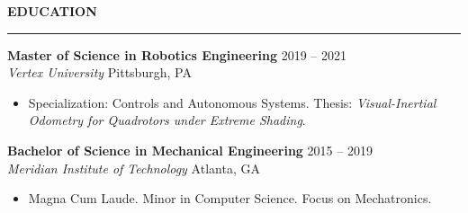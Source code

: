 \documentclass[10pt,letterpaper]{article}
\newcommand{\cvsection}[1]{%
  \vspace{6pt}%
  \phantomsection
  {\color{accent}\large\bfseries\MakeUppercase{#1}}%
  \vspace{1pt}%
  \par\noindent\textcolor{accent}{\rule{\linewidth}{1pt}}%
  \vspace{4pt}%
}
\newcommand{\cventry}[4]{%
  \noindent
  \begin{minipage}[t]{\linewidth}
    \textbf{#1} \hfill {\color{secondary}\small #2} \\
    \textit{#3} \hfill {\color{secondary}\small #4}
  \end{minipage}%
  \vspace{2pt}%
}
\begin{document}
\cvsection{Education}

\cventry{Master of Science in Robotics Engineering}{2019 -- 2021}{Vertex University}{Pittsburgh, PA}
\begin{itemize}
  \item Specialization: Controls and Autonomous Systems. Thesis: \textit{Visual-Inertial Odometry for Quadrotors under Extreme Shading}.
\end{itemize}

\cventry{Bachelor of Science in Mechanical Engineering}{2015 -- 2019}{Meridian Institute of Technology}{Atlanta, GA}
\begin{itemize}[after=\vspace{0pt}]
  \item Magna Cum Laude. Minor in Computer Science. Focus on Mechatronics.
\end{itemize}
\end{document}

